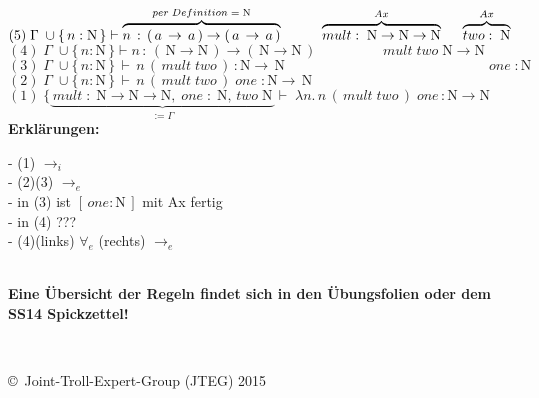 \documentclass{article}
\begin{document}
	\underline{
		$(5)\;
			\Gamma \;\cup \{\,n:\mathrm{N}\,\} \vdash
			\overbrace{
			n\,:\,(\,a\,\rightarrow\,a\,)\rightarrow (\,a\,\rightarrow \,a\,)
			}^{per\;Definition\; =\;\mathrm{N}}
			\hspace{1cm}
			\overbrace{
			mult:\;\mathrm{N}\rightarrow \mathrm{N}\rightarrow \mathrm{N}
			}^{Ax}
			\hspace{5mm}
			\overbrace{
			two:\;\mathrm{N}
			}^{Ax}
		$
	}\\
	\underline{
		$(4)\;
			\Gamma \;\cup \{\,n:\mathrm{N}\,\} \vdash 
			n\,:\,(\,\mathrm{N}\rightarrow \mathrm{N}\,)
			\rightarrow (\,\mathrm{N}\rightarrow \mathrm{N}\,)
			\hspace{2cm}
			mult\;two\;\mathrm{N}\rightarrow \mathrm{N}
		$
	}\\
	\underline{
	$	(3)\;
		\Gamma \; \cup \{\,n:\mathrm{N}\,\}\,
		\vdash \, n\,(\,mult\;two\,)\,: \mathrm{N}\rightarrow\,\mathrm{N}
		\hspace{6cm}
		\;one\; : \mathrm{N} 
	$
	}\\
	\underline{
	$(2)\;
		\Gamma \; \cup \{\,n:\mathrm{N}\,\}\,
		\vdash \, n\,(\,mult\;two\,)\;one\; : \mathrm{N}\rightarrow\,\mathrm{N}
	$\hspace{48mm}}
	\\
	$	(1)\;
	\{ 
		\underbrace{
			\,mult\;:\;
			\mathrm{N}\rightarrow\mathrm{N}\rightarrow\mathrm{N},\;
			one\; : \; \mathrm{N},\,two\;\mathrm{N}\,
		}_{:=\Gamma}	
	\vdash \; \lambda n.\,n\,(\, mult \; two\,)\;one\,:\mathrm{N}\rightarrow\mathrm{N}
	$		
	\\
	\textbf{Erkl\"arungen:}\\
	\begin{small}
	- (1) $\rightarrow_{i}$\\
	- (2)(3) $\rightarrow_e$\\
	- in (3) ist $[\,one:\mathrm{N}\,]$ mit Ax fertig\\
	- in (4) ???\\
	- (4)(links) $\forall_{e}$ (rechts) $\rightarrow_e$\\
	\end{small}	
	\\
	\textbf{Eine \"Ubersicht der Regeln findet sich in den \"Ubungsfolien oder dem SS14 Spickzettel!}
		
		
		
		
		
$ $\\\\
\begin{tiny}
	\copyright\ Joint-Troll-Expert-Group (JTEG) 2015
\end{tiny}
\end{document}
